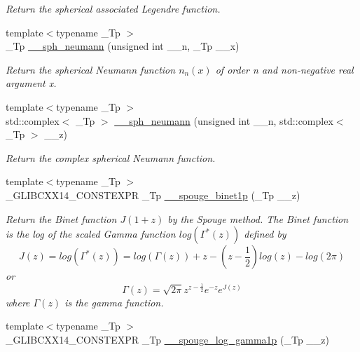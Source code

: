 \begin{DoxyCompactItemize}
\begin{DoxyCompactList}\small\item\em Return the spherical associated Legendre function. \end{DoxyCompactList}\item 
{\footnotesize template$<$typename \+\_\+\+Tp $>$ }\\\+\_\+\+Tp \hyperlink{namespacestd_1_1____detail_a94ac68003333b86b157a3b1e6ce44830}{\+\_\+\+\_\+sph\+\_\+neumann} (unsigned int \+\_\+\+\_\+n, \+\_\+\+Tp \+\_\+\+\_\+x)
\begin{DoxyCompactList}\small\item\em Return the spherical Neumann function $ n_n(x) $ of order n and non-\/negative real argument {\ttfamily x}. \end{DoxyCompactList}\item 
{\footnotesize template$<$typename \+\_\+\+Tp $>$ }\\std\+::complex$<$ \+\_\+\+Tp $>$ \hyperlink{namespacestd_1_1____detail_ac72e28d4d5fb8b0ffa033b9a47b67a8e}{\+\_\+\+\_\+sph\+\_\+neumann} (unsigned int \+\_\+\+\_\+n, std\+::complex$<$ \+\_\+\+Tp $>$ \+\_\+\+\_\+z)
\begin{DoxyCompactList}\small\item\em Return the complex spherical Neumann function. \end{DoxyCompactList}\item 
{\footnotesize template$<$typename \+\_\+\+Tp $>$ }\\\+\_\+\+G\+L\+I\+B\+C\+X\+X14\+\_\+\+C\+O\+N\+S\+T\+E\+X\+PR \+\_\+\+Tp \hyperlink{namespacestd_1_1____detail_afa9284858d2bffbdc5d79fcbab68c307}{\+\_\+\+\_\+spouge\+\_\+binet1p} (\+\_\+\+Tp \+\_\+\+\_\+z)
\begin{DoxyCompactList}\small\item\em Return the Binet function $ J(1+z) $ by the Spouge method. The Binet function is the log of the scaled Gamma function $ log(\Gamma^*(z)) $ defined by \[ J(z) = log(\Gamma^*(z)) = log\left(\Gamma(z)\right) + z - \left(z-\frac{1}{2}\right) log(z) - log(2\pi) \] or \[ \Gamma(z) = \sqrt{2\pi}z^{z-\frac{1}{2}}e^{-z}e^{J(z)} \] where $ \Gamma(z) $ is the gamma function. \end{DoxyCompactList}\item 
{\footnotesize template$<$typename \+\_\+\+Tp $>$ }\\\+\_\+\+G\+L\+I\+B\+C\+X\+X14\+\_\+\+C\+O\+N\+S\+T\+E\+X\+PR \+\_\+\+Tp \hyperlink{namespacestd_1_1____detail_a29cdf96d3726e15cb0652736971ba5a9}{\+\_\+\+\_\+spouge\+\_\+log\+\_\+gamma1p} (\+\_\+\+Tp \+\_\+\+\_\+z)

\end{DoxyCompactItemize}
